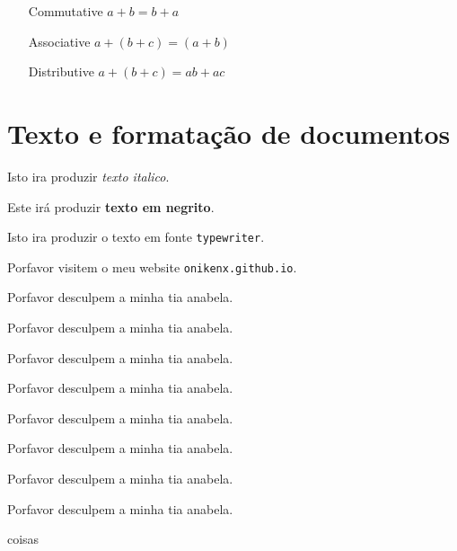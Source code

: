 \documentclass[a4paper,10pt]{article}
\begin{document}
 \begin{enumerate}
  \item[Commutative]$a+b=b+a$
  \item[Associative]$a+(b+c)=(a+b)$
  \item[Distributive]$a+(b+c)=ab+ac$
  
 \end{enumerate}
 
 \newpage
\section{Texto e formatação de documentos}
Isto ira produzir \textit{texto italico}.


Este irá produzir \textbf{texto em negrito}.

Isto ira produzir o texto em fonte \texttt{typewriter}.


Porfavor visitem o meu website \texttt{onikenx.github.io}.

Porfavor desculpem a minha tia anabela.
\begin{center}
\tiny
Porfavor desculpem a minha tia anabela.

\small
Porfavor desculpem a minha tia anabela.


\normalsize
Porfavor desculpem a minha tia anabela.

\large
Porfavor desculpem a minha tia anabela.

\Large
Porfavor desculpem a minha tia anabela.

\huge
Porfavor desculpem a minha tia anabela.

\Huge
Porfavor desculpem a minha tia anabela.

\end{center}
coisas
\end{document}
